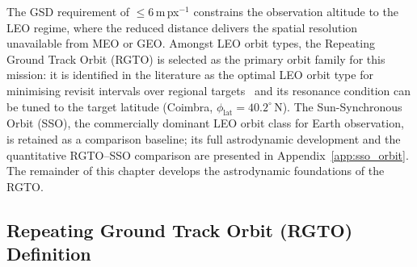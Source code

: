 



The GSD requirement of $\leq 6$\,m\,px$^{-1}$ constrains the observation altitude to the LEO regime, where the reduced distance delivers the spatial resolution unavailable from MEO or GEO.  Amongst LEO orbit types, the Repeating Ground Track Orbit (RGTO) is selected as the primary orbit family for this mission: it is identified in the literature as the optimal LEO orbit type for minimising revisit intervals over regional targets~\cite{hansonDesigningGoodPartial1990} and its resonance condition can be tuned to the target latitude (Coimbra, $\phi_{\text{lat}} = 40.2^{\circ}$\,N).  The Sun-Synchronous Orbit (SSO), the commercially dominant LEO orbit class for Earth observation, is retained as a comparison baseline; its full astrodynamic development and the quantitative RGTO--SSO comparison are presented in Appendix~\ref{app:sso_orbit}.  The remainder of this chapter develops the astrodynamic foundations of the RGTO.
 

\subsection{Repeating Ground Track Orbit (RGTO) Definition}
\label{72-RGTO_definition}

